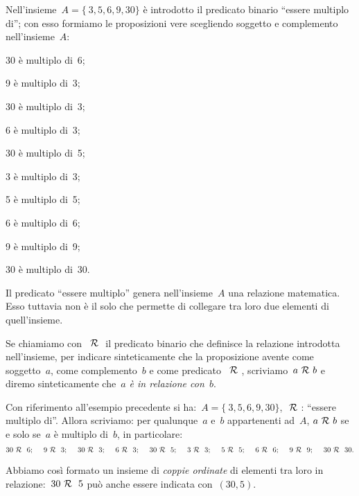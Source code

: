  \begin{esempio}
 Nell'insieme~\(A = \lbrace~3, 5, 6, 9, 30 \rbrace\) è introdotto il predicato 
binario ``essere multiplo di''; con esso formiamo le proposizioni vere 
scegliendo soggetto e
 complemento nell'insieme~\(A\):

\begin{multicols}{3}
30 è multiplo di~6;

9 è multiplo di~3;

30 è multiplo di~3;

6 è multiplo di~3;

30 è multiplo di~5;

3 è multiplo di~3;

5 è multiplo di~5;

6 è multiplo di~6;

9 è multiplo di~9;

30 è multiplo di~30.
\end{multicols}
Il predicato ``essere multiplo'' genera nell'insieme~\(A\) una relazione 
matematica. Esso tuttavia non è il
solo che permette di collegare tra loro due elementi di quell'insieme.
\end{esempio}


Se chiamiamo con~\(~\mathcal{R}~\) il predicato binario che definisce la relazione 
introdotta nell'insieme, per indicare sinteticamente
che la proposizione avente come soggetto~\(a\), come complemento~\(b\) e come 
predicato~\(~\mathcal{R}~\), scriviamo~\(a ~\mathcal{R}~ b\) e
diremo sinteticamente che~\emph{\(a\) è in relazione con~\(b\)}.

 \begin{esempio}
Con riferimento all'esempio precedente si ha:~\(A = \lbrace~3,5,6,9,30 
\rbrace\), 
\(~\mathcal{R}~\):
``essere multiplo di''. Allora scriviamo: per qualunque~\(a\) e~\(b\) 
appartenenti 
ad~\(A\),
\(a ~\mathcal{R}~ b\) se e solo se~\(a\) è multiplo di~\(b\), in particolare:
\[30 ~\mathcal{R}~~6;\quad~9 ~\mathcal{R}~~3;\quad~30 ~\mathcal{R}~~3;\quad~6 ~\mathcal{R}~~3;\quad~30 
~\mathcal{R}~~5;\quad~3 ~\mathcal{R}~~3;\quad~5 ~\mathcal{R}~~5;\quad~6 ~\mathcal{R}~~6;\quad~9 
~\mathcal{R}~~9;\quad~30 
~\mathcal{R}~~30.\]
\end{esempio}

Abbiamo così formato un insieme di \emph{coppie ordinate} di elementi tra loro 
in relazione:~\(30 ~\mathcal{R}~~5\) può anche essere indicata con~\((30,5)\).

